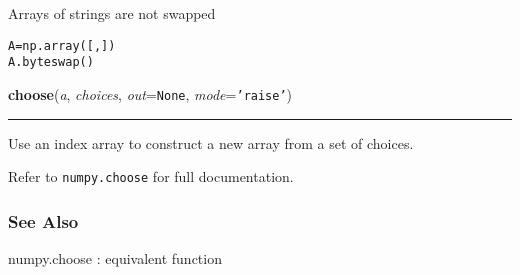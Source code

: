 \begin{boxedminipage}{\textwidth}
Arrays of strings are not swapped
\begin{alltt}
\pysrcprompt{{\textgreater}{\textgreater}{\textgreater} }A = np.array([, ])
\pysrcprompt{{\textgreater}{\textgreater}{\textgreater} }A.byteswap()
\end{alltt}
    \vspace{1ex}

    \end{boxedminipage}

    \label{numpy:ndarray:choose}

    \vspace{0.5ex}

    \begin{boxedminipage}{\textwidth}

    \raggedright \textbf{choose}(\textit{a}, \textit{choices}, \textit{out}=\texttt{None}, \textit{mode}=\texttt{'raise'})

    \vspace{-1.5ex}

    \rule{\textwidth}{0.5\fboxrule}

Use an index array to construct a new array from a set of choices.

Refer to \texttt{numpy.choose} for full documentation.



\hypertarget{see-also}{}
\subsubsection*{See Also}

numpy.choose : equivalent function
    \vspace{1ex}

    \end{boxedminipage}

    \label{numpy:ndarray:clip}

    \vspace{0.5ex}

